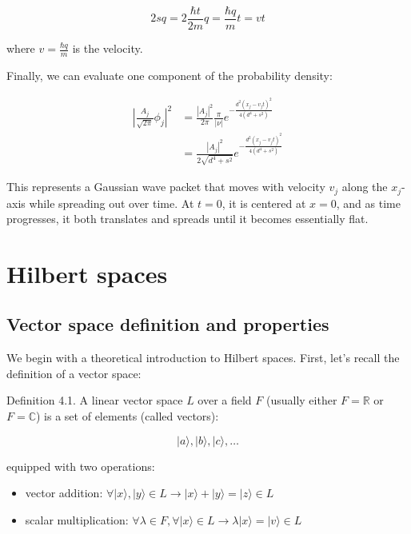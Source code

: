 \documentclass[italian]{HKNdocument}
\begin{document}
\begin{equation}
2sq = 2\frac{\hbar t}{2m}q = \frac{\hbar q}{m}t = vt
\end{equation}

where $v = \frac{\hbar q}{m}$ is the velocity.

Finally, we can evaluate one component of the probability density:

\begin{align}
\left|\frac{A_j}{\sqrt{2\pi}}\phi_j\right|^2 &= \frac{|A_j|^2}{2\pi}\frac{\pi}{|\nu|}e^{-\frac{d^2(x_j-v_jt)^2}{4(d^4+s^2)}} \\
&= \frac{|A_j|^2}{2\sqrt{d^4+s^2}}e^{-\frac{d^2(x_j-v_jt)^2}{4(d^4+s^2)}}
\end{align}

This represents a Gaussian wave packet that moves with velocity $v_j$ along the $x_j$-axis while spreading out over time. At $t=0$, it is centered at $x=0$, and as time progresses, it both translates and spreads until it becomes essentially flat.

\section{Hilbert spaces}
\subsection{Vector space definition and properties}

We begin with a theoretical introduction to Hilbert spaces. First, let's recall the definition of a vector space:

Definition 4.1. A linear vector space $L$ over a field $F$ (usually either $F=\mathbb{R}$ or $F=\mathbb{C}$) is a set of elements (called vectors):

\begin{equation}
|a\rangle, |b\rangle, |c\rangle, \ldots
\end{equation}

equipped with two operations:
\begin{itemize}
  \item vector addition: $\forall|x\rangle,|y\rangle \in L \longrightarrow |x\rangle+|y\rangle=|z\rangle \in L$
  \item scalar multiplication: $\forall \lambda \in F, \forall|x\rangle \in L \longrightarrow \lambda|x\rangle=|v\rangle \in L$
\end{itemize}
\end{document}

